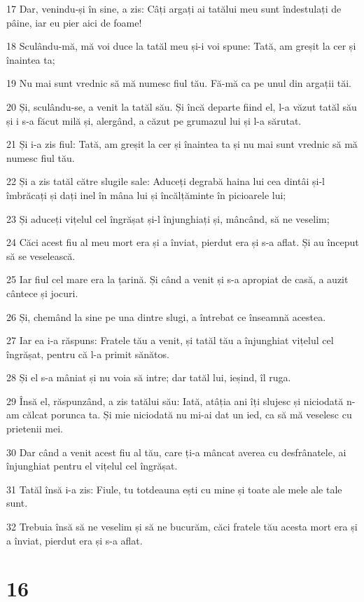 \par 17 Dar, venindu-și în sine, a zis: Câți argați ai tatălui meu sunt îndestulați de pâine, iar eu pier aici de foame!
\par 18 Sculându-mă, mă voi duce la tatăl meu și-i voi spune: Tată, am greșit la cer și înaintea ta;
\par 19 Nu mai sunt vrednic să mă numesc fiul tău. Fă-mă ca pe unul din argații tăi.
\par 20 Și, sculându-se, a venit la tatăl său. Și încă departe fiind el, l-a văzut tatăl său și i s-a făcut milă și, alergând, a căzut pe grumazul lui și l-a sărutat.
\par 21 Și i-a zis fiul: Tată, am greșit la cer și înaintea ta și nu mai sunt vrednic să mă numesc fiul tău.
\par 22 Și a zis tatăl către slugile sale: Aduceți degrabă haina lui cea dintâi și-l îmbrăcați și dați inel în mâna lui și încălțăminte în picioarele lui;
\par 23 Și aduceți vițelul cel îngrășat și-l înjunghiați și, mâncând, să ne veselim;
\par 24 Căci acest fiu al meu mort era și a înviat, pierdut era și s-a aflat. Și au început să se veselească.
\par 25 Iar fiul cel mare era la țarină. Și când a venit și s-a apropiat de casă, a auzit cântece și jocuri.
\par 26 Și, chemând la sine pe una dintre slugi, a întrebat ce înseamnă acestea.
\par 27 Iar ea i-a răspuns: Fratele tău a venit, și tatăl tău a înjunghiat vițelul cel îngrășat, pentru că l-a primit sănătos.
\par 28 Și el s-a mâniat și nu voia să intre; dar tatăl lui, ieșind, îl ruga.
\par 29 Însă el, răspunzând, a zis tatălui său: Iată, atâția ani îți slujesc și niciodată n-am călcat porunca ta. Și mie niciodată nu mi-ai dat un ied, ca să mă veselesc cu prietenii mei.
\par 30 Dar când a venit acest fiu al tău, care ți-a mâncat averea cu desfrânatele, ai înjunghiat pentru el vițelul cel îngrășat.
\par 31 Tatăl însă i-a zis: Fiule, tu totdeauna ești cu mine și toate ale mele ale tale sunt.
\par 32 Trebuia însă să ne veselim și să ne bucurăm, căci fratele tău acesta mort era și a înviat, pierdut era și s-a aflat.

\chapter{16}

